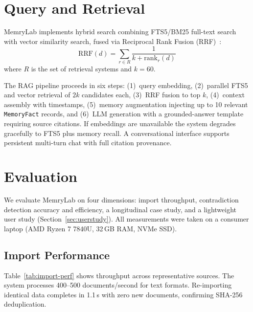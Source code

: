 \documentclass[conference]{IEEEtran}
\begin{document}
\section{Query and Retrieval}
\label{sec:query}

MemryLab implements hybrid search combining FTS5/BM25 full-text search~\cite{sqlite2023fts5,robertson2009bm25} with vector similarity search, fused via Reciprocal Rank Fusion (RRF)~\cite{cormack2009rrf}:
\begin{equation}
\text{RRF}(d) = \sum_{r \in R} \frac{1}{k + \text{rank}_r(d)}
\label{eq:rrf}
\end{equation}
where $R$ is the set of retrieval systems and $k{=}60$.

The RAG pipeline proceeds in six steps: (1)~query embedding, (2)~parallel FTS5 and vector retrieval of $2k$ candidates each, (3)~RRF fusion to top $k$, (4)~context assembly with timestamps, (5)~memory augmentation injecting up to 10 relevant \texttt{MemoryFact} records, and (6)~LLM generation with a grounded-answer template requiring source citations. If embeddings are unavailable the system degrades gracefully to FTS5 plus memory recall. A conversational interface supports persistent multi-turn chat with full citation provenance.

\section{Evaluation}
\label{sec:evaluation}

We evaluate MemryLab on four dimensions: import throughput, contradiction detection accuracy and efficiency, a longitudinal case study, and a lightweight user study (Section~\ref{sec:userstudy}). All measurements were taken on a consumer laptop (AMD Ryzen 7 7840U, 32\,GB RAM, NVMe SSD).

\subsection{Import Performance}

Table~\ref{tab:import-perf} shows throughput across representative sources. The system processes 400--500 documents/second for text formats. Re-importing identical data completes in 1.1\,s with zero new documents, confirming SHA-256 deduplication.
\end{document}
